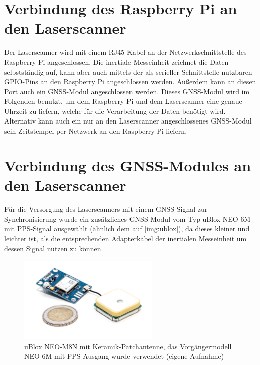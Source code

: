 \documentclass[a4paper,12pt,bibliography=totoc, listof=totoc,titlepage,pointlessnumbers]{scrreprt}
\begin{document}
\section{Verbindung des Rasp\-berry Pi an den Laser\-scan\-ner}
Der Laser\-scan\-ner wird mit einem RJ45-Kabel an der Netzwerkschnittstelle des Raspberry Pi angeschlossen. Die inertiale Messeinheit zeichnet die Daten selbst\-stän\-dig auf, kann aber auch mittels der als serieller Schnittstelle nutzbaren GPIO-Pins an den Rasp\-berry Pi angeschlossen werden. Außerdem kann an diesen Port auch ein GNSS-Modul angeschlossen werden. Dieses GNSS-Modul wird im Folgenden benutzt, um dem Rasp\-berry Pi und dem Laserscanner eine genaue Uhrzeit zu liefern, welche für die Verarbeitung der Daten benötigt wird. Alternativ kann auch ein nur an den Laser\-scan\-ner angeschlossenes GNSS-Modul sein Zeitstempel per Netzwerk an den Rasp\-berry Pi liefern.

\section{Verbindung des GNSS-Modules an den Laser\-scan\-ner}
\label{s:GNSSAnschluss}
Für die Versorgung des Laser\-scan\-ners mit einem GNSS-Signal zur Synchronisierung wurde ein zusätzliches GNSS-Modul vom Typ uBlox NEO-6M mit PPS-Signal ausgewählt (ähnlich dem auf \autoref{img:ublox}), da dieses kleiner und leichter ist, als die entsprechenden Adapterkabel der inertialen Messeinheit um dessen Signal nutzen zu können.

\begin{figure}[!ht]
 \centering
 \includegraphics[width=0.6\textwidth]{./img/ublox.jpg}
 \caption{uBlox NEO-M8N mit Keramik-Patchantenne, das Vorgängermodell NEO-6M mit PPS-Ausgang wurde verwendet (eigene Aufnahme)}
 \label{img:ublox}
\end{figure}
\end{document}
